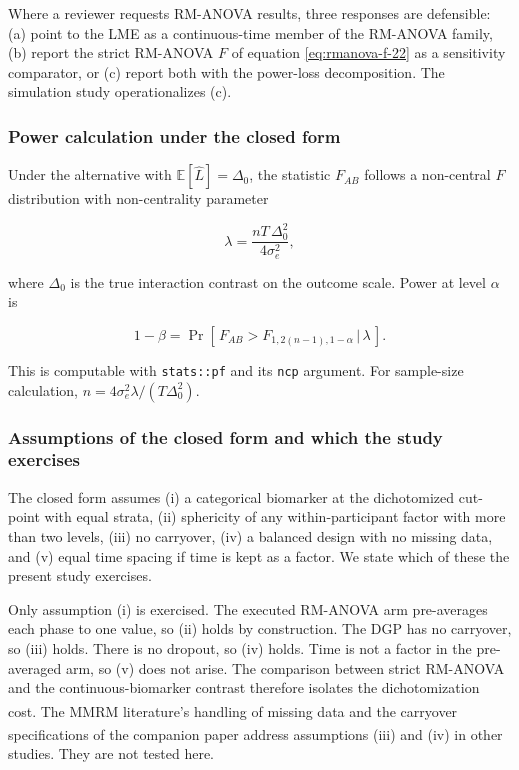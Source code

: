 \documentclass[
  11pt,
]{article}
\begin{document}
Where a reviewer requests RM-ANOVA results, three responses are
defensible: (a) point to the LME as a continuous-time member of the
RM-ANOVA family, (b) report the strict RM-ANOVA \(F\) of equation
\eqref{eq:rmanova-f-22} as a sensitivity comparator, or (c) report
both with the power-loss decomposition. The simulation study
operationalizes (c).

\subsubsection{Power calculation under the closed form}\label{power-calculation-under-the-closed-form}

Under the alternative with \(\mathbb{E}[\hat L] = \Delta_0\), the
statistic \(F_{AB}\) follows a non-central \(F\) distribution with
non-centrality parameter

\begin{equation}
\lambda = \frac{nT\,\Delta_0^2}{4\sigma_e^2} ,
\label{eq:rmanova-ncp}
\end{equation}

where \(\Delta_0\) is the true interaction contrast on the outcome
scale. Power at level \(\alpha\) is

\begin{equation}
1 - \beta = \Pr\!\left[\, F_{AB} > F_{1, 2(n-1), 1-\alpha}
\,\big|\, \lambda \,\right] .
\label{eq:rmanova-power}
\end{equation}

This is computable with \texttt{stats::pf} and its \texttt{ncp} argument. For
sample-size calculation, \(n = 4\sigma_e^2 \lambda / (T
\Delta_0^2)\).

\subsubsection{Assumptions of the closed form and which the study exercises}\label{assumptions-of-the-closed-form-and-which-the-study-exercises}

The closed form assumes (i) a categorical biomarker at the
dichotomized cut-point with equal strata, (ii) sphericity of any
within-participant factor with more than two levels, (iii) no
carryover, (iv) a balanced design with no missing data, and (v)
equal time spacing if time is kept as a factor. We state which of
these the present study exercises.

Only assumption (i) is exercised. The executed RM-ANOVA arm
pre-averages each phase to one value, so (ii) holds by
construction. The DGP has no carryover, so (iii) holds. There is no
dropout, so (iv) holds. Time is not a factor in the pre-averaged
arm, so (v) does not arise. The comparison between strict RM-ANOVA
and the continuous-biomarker contrast therefore isolates the
dichotomization cost. The MMRM literature's handling of missing data\textsuperscript{} and the carryover specifications
of the companion paper\textsuperscript{} address assumptions
(iii) and (iv) in other studies. They are not tested here.
\end{document}
